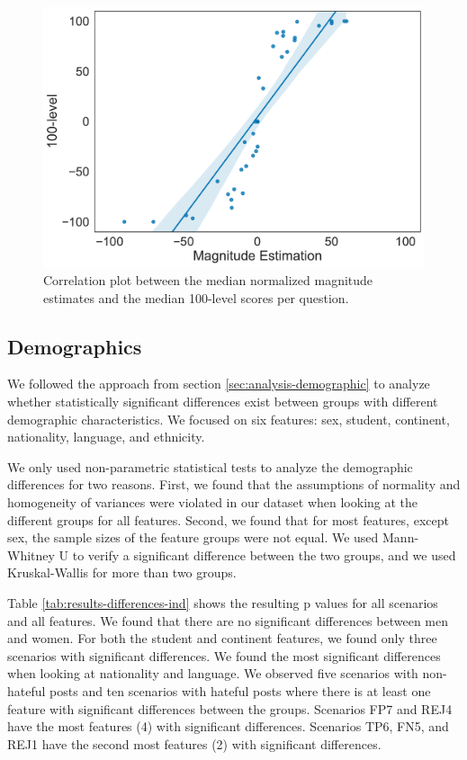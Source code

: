 \begin{figure}
    \centering
    \includegraphics[scale=.4]{Figures/correlation.pdf}
    \caption{Correlation plot between the median normalized magnitude estimates and the median 100-level scores per question.}
    \label{fig:correlation}
\end{figure}

\subsection{Demographics}
\label{sec:results-demographics}
We followed the approach from section \ref{sec:analysis-demographic} to analyze whether statistically significant differences exist between groups with different demographic characteristics.
%
We focused on six features: sex, student, continent, nationality, language, and ethnicity.
%

%
We only used non-parametric statistical tests to analyze the demographic differences for two reasons.
%
First, we found that the assumptions of normality and homogeneity of variances were violated in our dataset when looking at the different groups for all features.
%
Second, we found that for most features, except sex, the sample sizes of the feature groups were not equal.
%
We used Mann-Whitney U to verify a significant difference between the two groups, and we used Kruskal-Wallis for more than two groups.
%

%
Table \ref{tab:results-differences-ind} shows the resulting p values for all scenarios and all features.
%
We found that there are no significant differences between men and women.
%
For both the student and continent features, we found only three scenarios with significant differences.
%
We found the most significant differences when looking at nationality and language.
%
We observed five scenarios with non-hateful posts and ten scenarios with hateful posts where there is at least one feature with significant differences between the groups.
%
Scenarios FP7 and REJ4 have the most features (4) with significant differences.
%
Scenarios TP6, FN5, and REJ1 have the second most features (2) with significant differences.
%

